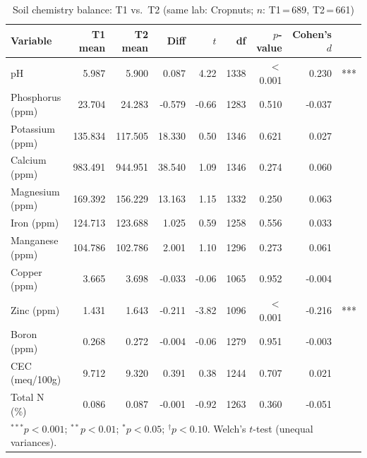 \documentclass[12pt]{article}
\begin{document}
\begin{table}[htbp]
\centering
\caption{Soil chemistry balance: T1 vs.\ T2 (same lab: Cropnuts; $n$: T1\,=\,689, T2\,=\,661)}
\label{tab:balance_t1_t2}
\small
\begin{tabular}{lrrrrrrrl}
\toprule
Variable & T1 mean & T2 mean & Diff & $t$ & df & $p$-value & Cohen's $d$ & \\
\midrule
pH & 5.987 & 5.900 & 0.087 & 4.22 & 1338 & $<$0.001 & 0.230 & *** \\
Phosphorus (ppm) & 23.704 & 24.283 & -0.579 & -0.66 & 1283 & 0.510 & -0.037 &  \\
Potassium (ppm) & 135.834 & 117.505 & 18.330 & 0.50 & 1346 & 0.621 & 0.027 &  \\
Calcium (ppm) & 983.491 & 944.951 & 38.540 & 1.09 & 1346 & 0.274 & 0.060 &  \\
Magnesium (ppm) & 169.392 & 156.229 & 13.163 & 1.15 & 1332 & 0.250 & 0.063 &  \\
Iron (ppm) & 124.713 & 123.688 & 1.025 & 0.59 & 1258 & 0.556 & 0.033 &  \\
Manganese (ppm) & 104.786 & 102.786 & 2.001 & 1.10 & 1296 & 0.273 & 0.061 &  \\
Copper (ppm) & 3.665 & 3.698 & -0.033 & -0.06 & 1065 & 0.952 & -0.004 &  \\
Zinc (ppm) & 1.431 & 1.643 & -0.211 & -3.82 & 1096 & $<$0.001 & -0.216 & *** \\
Boron (ppm) & 0.268 & 0.272 & -0.004 & -0.06 & 1279 & 0.951 & -0.003 &  \\
CEC (meq/100g) & 9.712 & 9.320 & 0.391 & 0.38 & 1244 & 0.707 & 0.021 &  \\
Total N (\%) & 0.086 & 0.087 & -0.001 & -0.92 & 1263 & 0.360 & -0.051 &  \\
\bottomrule
\multicolumn{9}{l}{\footnotesize $^{***}p<0.001$; $^{**}p<0.01$; $^{*}p<0.05$; $^{\dag}p<0.10$. Welch's $t$-test (unequal variances).} \\
\end{tabular}
\end{table}
\end{document}
